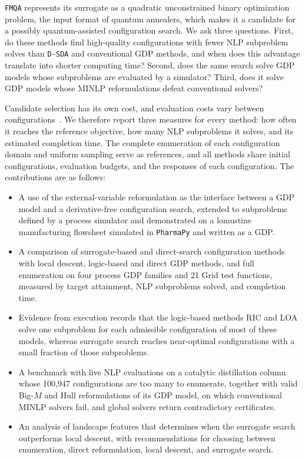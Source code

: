 \documentclass{article}
\begin{document}
\texttt{FMQA} represents its surrogate as a quadratic unconstrained binary optimization problem, the input format of quantum annealers, which makes it a candidate for a possibly quantum-assisted configuration search.
We ask three questions.
First, do these methods find high-quality configurations with fewer NLP subproblem solves than \texttt{D-SDA} and conventional GDP methods, and when does this advantage translate into shorter computing time?
Second, does the same search solve GDP models whose subproblems are evaluated by a simulator?
Third, does it solve GDP models whose MINLP reformulations defeat conventional solvers?

Candidate selection has its own cost, and evaluation costs vary between configurations~\citep{more2009benchmarking}.
We therefore report three measures for every method: how often it reaches the reference objective, how many NLP subproblems it solves, and its estimated completion time.
The complete enumeration of each configuration domain and uniform sampling serve as references, and all methods share initial configurations, evaluation budgets, and the responses of each configuration.
The contributions are as follows:
\begin{itemize}
\item A use of the external-variable reformulation as the interface between a GDP model and a derivative-free configuration search, extended to subproblems defined by a process simulator and demonstrated on a lomustine manufacturing flowsheet simulated in \texttt{PharmaPy} and written as a GDP.
\item A comparison of surrogate-based and direct-search configuration methods with local descent, logic-based and direct GDP methods, and full enumeration on four process GDP families and 21 Grid test functions, measured by target attainment, NLP subproblems solved, and completion time.
\item Evidence from execution records that the logic-based methods RIC and LOA solve one subproblem for each admissible configuration of most of these models, whereas surrogate search reaches near-optimal configurations with a small fraction of those subproblems.
\item A benchmark with live NLP evaluations on a catalytic distillation column whose 100,947 configurations are too many to enumerate, together with valid Big-\(M\) and Hull reformulations of its GDP model, on which conventional MINLP solvers fail, and global solvers return contradictory certificates.
\item An analysis of landscape features that determines when the surrogate search outperforms local descent, with recommendations for choosing between enumeration, direct reformulation, local descent, and surrogate search.
\end{itemize}
\end{document}
